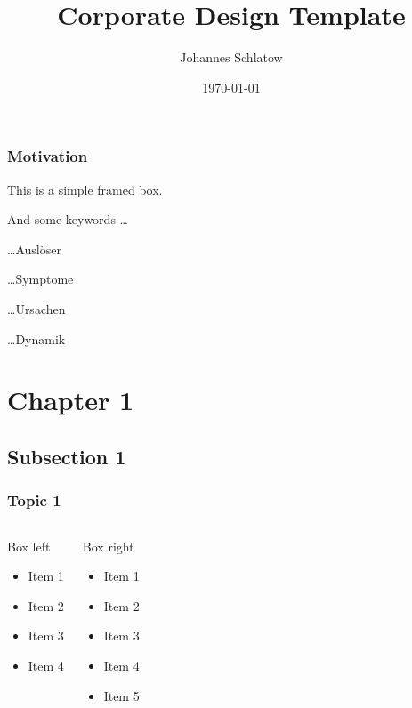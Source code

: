 \documentclass[
	ngerman,
	xcolor=dvipsnames,
	11pt
	]{beamer}
\title[ShortTitle]{Corporate Design Template}
\author{Johannes Schlatow}
\institute{}
\date{\today}
\newenvironment{annot}{\begin{block}{}}{\end{block}}
\begin{document}
\begin{frame}[t,plain]
	\titlepage
\end{frame}

\begin{frame}
	\frametitle{Motivation}
\begin{annot}
	This is a simple framed box.
\end{annot}

And some keywords \ldots
\begin{description}
	\item \ldots Auslöser
	\item \ldots Symptome
	\item \ldots Ursachen
	\item \ldots Dynamik
\end{description}
\end{frame}

\section{Chapter 1}
\subsection{Subsection 1}
\begin{frame}
	\frametitle{Topic 1}

	\begin{columns}[t]
		\begin{block}{Box left}
			\begin{itemize}
				\item Item 1
				\item Item 2
				\item Item 3
				\item Item 4
			\end{itemize}
		\end{block}
		\pause

		\begin{block}{Box right}
			\begin{itemize}
				\item Item 1
				\item Item 2
				\item Item 3
				\item Item 4
				\item Item 5
			\end{itemize}
		\end{block}
	\end{columns}
\end{frame}
\end{document}
